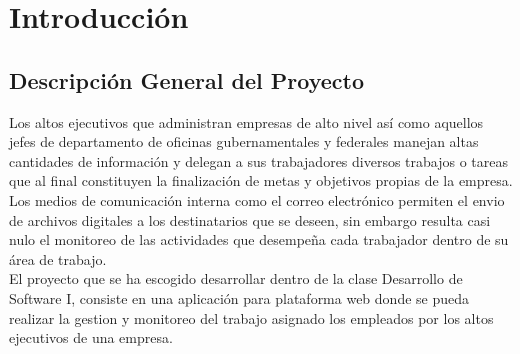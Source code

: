 \documentclass[11pt,a4paper]{article}
\begin{document}
\section {Introducción}

\subsection{Descripción General del Proyecto}
Los altos ejecutivos que administran empresas de alto nivel así como aquellos jefes de departamento de oficinas gubernamentales y federales manejan altas cantidades de información y delegan a sus trabajadores diversos trabajos o tareas que al final constituyen la finalización de metas y objetivos propias de la empresa. Los medios de comunicación interna como el correo electrónico permiten el envio de archivos digitales a los destinatarios que se deseen, sin embargo resulta casi nulo el monitoreo de las actividades que desempeña cada trabajador dentro de su área de trabajo.\\
El proyecto que se ha escogido desarrollar dentro de la clase Desarrollo de Software I, consiste en una aplicación para plataforma web donde se pueda realizar la gestion y monitoreo del trabajo asignado los empleados por los altos ejecutivos de una empresa.
\\
\end{document}
